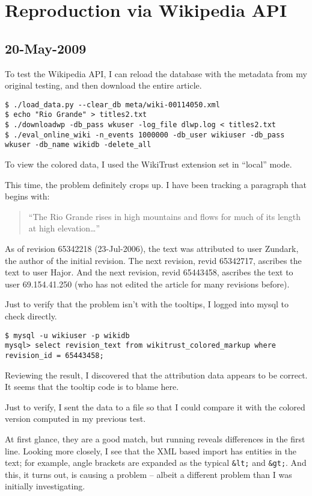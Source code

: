 \section{Reproduction via Wikipedia API}

\subsection{20-May-2009}

To test the Wikipedia API, I can reload the database with the
metadata from my original testing, and then download the
entire  article.
\begin{verbatim}
$ ./load_data.py --clear_db meta/wiki-00114050.xml
$ echo "Rio Grande" > titles2.txt
$ ./downloadwp -db_pass wkuser -log_file dlwp.log < titles2.txt
$ ./eval_online_wiki -n_events 1000000 -db_user wikiuser -db_pass wkuser -db_name wikidb -delete_all
\end{verbatim}
To view the colored data, I used the WikiTrust extension
set in ``local'' mode.

This time, the problem definitely crops up.
I have been tracking a paragraph that begins with:
\begin{quote}
``The Rio Grande rises in high mountains and flows for
much of its length at high elevation\ldots''
\end{quote}
As of revision 65342218 (23-Jul-2006), the text was attributed to
user Zundark, the author of the initial revision.
The next revision, revid 65342717, ascribes the text
to user Hajor.
And the next revision, revid 65443458, ascribes the text
to user 69.154.41.250 (who has not edited the article for
many revisions before).

Just to verify that the problem isn't with the tooltips,
I logged into mysql to check directly.
\begin{verbatim}
$ mysql -u wikiuser -p wikidb
mysql> select revision_text from wikitrust_colored_markup where revision_id = 65443458;
\end{verbatim}
Reviewing the result, I discovered that the attribution
data appears to be correct.
It seems that the tooltip code is to blame here.

Just to verify, I sent the data to a file so that I
could compare it with the colored version computed
in my previous test.

At first glance, they are a good match, but running 
reveals differences in the first line.
Looking more closely, I see that the XML based import
has entities in the text; for example, angle brackets
are expanded as the typical \texttt{\&lt;} and \texttt{\&gt;}.
And this, it turns out, is causing a problem -- albeit a
different problem than I was initially investigating.

